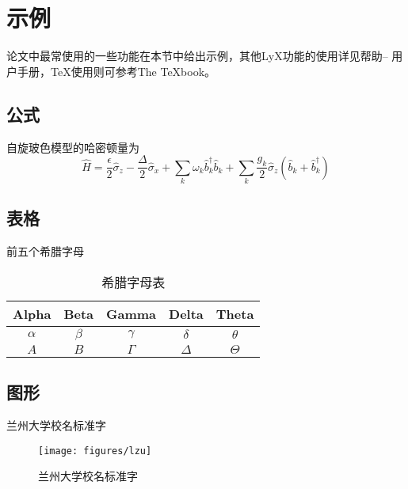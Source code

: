 \documentclass[twoside,longtitle]{LZUthesis}
\begin{document}
\section{示例}

论文中最常使用的一些功能在本节中给出示例，其他LyX功能的使用详见帮助-- 用户手册，\TeX{}使用则可参考The \TeX{}book\cite{Knut04-T}。


\subsection{公式}

自旋玻色模型的哈密顿量为
\begin{equation}
\hat{H}=\frac{\epsilon}{2}\hat{\sigma}_{z}-\frac{\Delta}{2}\hat{\sigma}_{x}+\sum_{k}\omega_{k}\hat{b}_{k}^{\dagger}\hat{b}_{k}+\sum_{k}\frac{g_{k}}{2}\hat{\sigma}_{z}(\hat{b}_{k}+\hat{b}_{k}^{\dagger})\label{eq:sbm}
\end{equation}



\subsection{表格}

前五个希腊字母
\begin{table}[H]
\begin{centering}
\begin{tabular}{|c|c|c|c|c|}
\hline
Alpha & Beta & Gamma & Delta & Theta\\
\hline
$\alpha$ & $\beta$ & $\gamma$ & $\delta$ & $\theta$\\
\hline
$A$ & $B$ & $\Gamma$ & $\Delta$ & $\Theta$\\
\hline
\end{tabular}
\par\end{centering}

\protect\caption{希腊字母表\label{tab:Greek}}


\end{table}



\subsection{图形}
兰州大学校名标准字
\begin{figure}[H]
\begin{centering}
\texttt{[image: figures/lzu]}
\par\end{centering}

\protect\caption{兰州大学校名标准字\label{fig:lzu}}
\end{figure}
\end{document}
